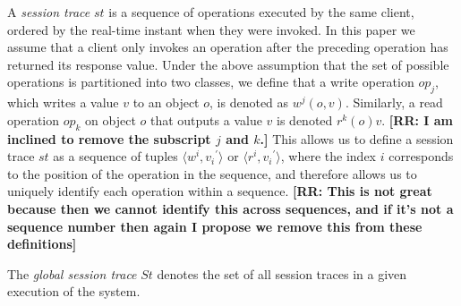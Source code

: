 \documentclass{sig-alternate-05-2015}
\begin{document}
  A \emph{session trace} $\mathit{st}$ is a sequence of operations executed by the same client, ordered by the real-time instant when they were invoked. In this paper we assume that a client only invokes an operation after the preceding operation has returned its response value.
Under the above assumption that the set of possible operations is partitioned into two classes, we define that a write operation $\mathit{op}_j$, which writes a value $v$ to an object $o$, is denoted as $w^j(o,v)$. Similarly, a read operation $\mathit{op}_k$ on object $o$ that outputs a value $v$ is denoted $r^k(o){v}$. {\bf [RR: I am inclined to remove the subscript $j$ and $k$.]}
 \def\tuple#1{\langle #1\rangle}
This allows us to define a session trace $\mathit{st}$ as a sequence of tuples  $\tuple{w^i, {v_i}^{'}}$ or
 $\tuple{r^i, {v_i}^{'}}$, where the index $i$ corresponds to the position of the operation in the sequence, and therefore allows us to uniquely identify each operation within a sequence. {\bf [RR: This is not great because then we cannot identify this across sequences, and if it's not a sequence number then again I propose we remove this from these definitions]}

The \emph{global session trace} $\mathit{St}$ denotes the set of all
   session traces in a given execution of the system.
\end{document}
